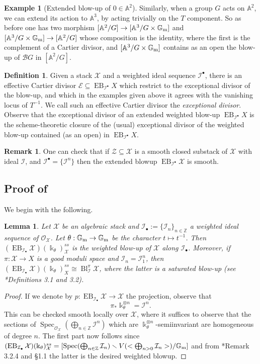 \documentclass{amsart}
\newcommand{\bA}{\mathbb{A}}
\newcommand{\bG}{\mathbb{G}}
\newcommand{\bZ}{\mathbb{Z}}
\newcommand{\cB}{\mathcal{B}}
\newcommand{\cE}{\mathcal{E}}
\newcommand{\cI}{\mathcal{I}}
\newcommand{\cO}{\mathcal{O}}
\newcommand{\cX}{\mathcal{X}}
\newcommand{\cZ}{\mathcal{Z}}
\newcommand{\spec}{\operatorname{Spec}}
\newcommand{\Gm}{\bG_{{\rm m}}}
\newcommand{\Bl}{\operatorname{Bl}}
\DeclareMathOperator{\EB}{EB}
\newtheorem{Lemma}[theorem]{Lemma}
\theoremstyle{definition}
\newtheorem{Def}[theorem]{Definition}
\newtheorem{Remark}[theorem]{Remark}
\theoremstyle{definition}
\newtheorem{example}[theorem]{Example}
\begin{document}
{\begin{example}[Extended blow-up of $0\in \bA^2$]
    Similarly, when a group $G$ acts on $\bA^2$, we can extend its action to $\bA^3$,
    by acting trivially on the $T$ component. So as before one has two morphism $[\bA^2/G]\to[\bA^3/G\times \Gm] $ and $[\bA^3/G\times \Gm]\to [\bA^2/G]$ whose composition is the identity, where the first is the complement of a Cartier divisor, and $[\bA^3/G\times \Gm]$ contains as an open the blow-up of $\cB G$ in $[\bA^2/G]$. 
\end{example}
\begin{Def}\label{def_gen_blowup_comes_with_a_cartier_divisor} Given a stack $\cX$ and a weighted ideal sequence $\cI^\bullet$, there is an effective Cartier divisor $\cE\subseteq \EB_{\cI^\bullet}X$ which restrict to the exceptional divisor of the blow-up, and which in the examples given above it agrees with the vanishing locus of $T^{-1}$. We call such an effective Cartier divisor the \textit{exceptional divisor}. Observe that the exceptional divisor of an extended weighted blow-up $\EB_{\cI^\bullet}X$ is the scheme-theoretic closure of the (usual) exceptional divisor of the weighted blow-up contained (as an open) in $\EB_{\cI^\bullet}X$.
\end{Def}
\begin{Remark}
    One can check that if $\cZ\subseteq \cX$ is a smooth closed substack of $\cX$ with ideal $\cI$, and $\cI^\bullet = \{\cI^n\}$ then the extended blowup $\EB_{\cI^\bullet}\cX$ is smooth.
\end{Remark}
\subsection{Proof of }
We begin with the following.
\begin{Lemma}\label{lemma_ext_blowup_is_relative_ss_locus}
    Let $\cX$ be an algebraic stack and $\cI_\bullet:=\{\cI_n\}_{n\in \bZ}$ a weighted ideal sequence of $\cO_\cX$. Let $\theta:\Gm\to \Gm$ be the character $t\mapsto t^{-1}$.
    Then $(\EB_{\cI_\bullet} \cX)(\Bbbk_{\theta} )^{ss}_{\cX}$
    is the weighted blow-up of $\cX$ along $\cI_\bullet$. Moreover, if $\pi:\cX\to X$ is a good moduli space and $\cI_n=\cI_1^n$, then $(\EB_{\cI_\bullet} \cX)(\Bbbk_{\theta} )^{ss}_{X}\cong \Bl^\pi_\cI\cX$, where the latter is a saturated blow-up (see \cite{ER21}*{Definitions 3.1 and 3.2}).
\end{Lemma}
\begin{proof}If we denote by $p:\EB_{\cI_\bullet}\cX\to \cX$ the projection, observe that \[
    \pi_*\Bbbk_{\theta}^{\otimes n} = \cI^n.
    \]
    This can be checked smooth locally over $\cX$, where it suffices to observe that the sections of $\spec_{\cO_\cX}(\bigoplus_{n\in \bZ}\cI^n)$ which are $\Bbbk_{\theta}^{\otimes n}$-semiinvariant are homogeneous of degree $n$.
    The first part now follows since $(\EB_{\cI_\bullet}\cX)(\Bbbk_{\theta}  )^{ss}_{\cX} = [\spec(\bigoplus_{n\in \bZ} \cI_n)\smallsetminus V(<\bigoplus_{n>0}\cI_n>)/\Gm]$ and from \cite{QR}*{Remark 3.2.4 and \S 1.1} the latter is the desired weighted blowup.


\end{proof}}
\end{document}
